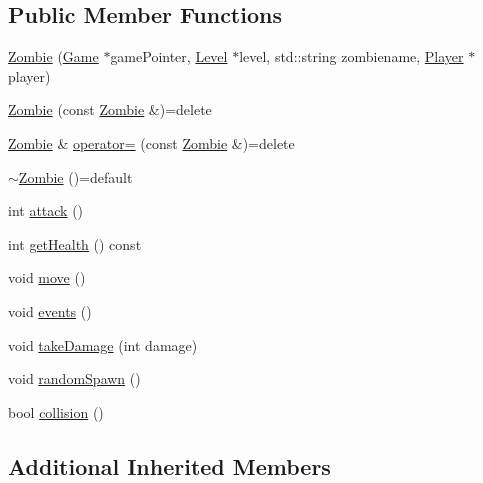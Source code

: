 \subsection*{Public Member Functions}
\begin{DoxyCompactItemize}
\item 
\hyperlink{classZombie_a490b91b7f34c4e3d8a3d4b42e6ef018c}{Zombie} (\hyperlink{classGame}{Game} $\ast$game\-Pointer, \hyperlink{classLevel}{Level} $\ast$level, std\-::string zombiename, \hyperlink{classPlayer}{Player} $\ast$player)
\item 
\hyperlink{classZombie_a1551812e760c7623f3b015e948d3d711}{Zombie} (const \hyperlink{classZombie}{Zombie} \&)=delete
\item 
\hyperlink{classZombie}{Zombie} \& \hyperlink{classZombie_ac110303450e69fd7cf672ac6812cbffe}{operator=} (const \hyperlink{classZombie}{Zombie} \&)=delete
\item 
\hyperlink{classZombie_ae3405ba8c88578dfa9d05cdeae0bab9f}{$\sim$\-Zombie} ()=default
\item 
int \hyperlink{classZombie_a7043da61be95308e7a952adaae347b7e}{attack} ()
\item 
int \hyperlink{classZombie_a2cf90eec8daea5e1cda6e3cdff4b0147}{get\-Health} () const 
\item 
void \hyperlink{classZombie_adc60ee88311d12f8fe150f5917943d2b}{move} ()
\item 
void \hyperlink{classZombie_af9f6fdd900c769f17d0e2dccb0db33c3}{events} ()
\item 
void \hyperlink{classZombie_a2fde39f3efac6da9062cf29e20c71b84}{take\-Damage} (int damage)
\item 
void \hyperlink{classZombie_ad45b25d75c9a2875a6b7fb8a272d2191}{random\-Spawn} ()
\item 
bool \hyperlink{classZombie_a41b274a28ed94dddb23794e6f6cc81f1}{collision} ()
\end{DoxyCompactItemize}
\subsection*{Additional Inherited Members}


